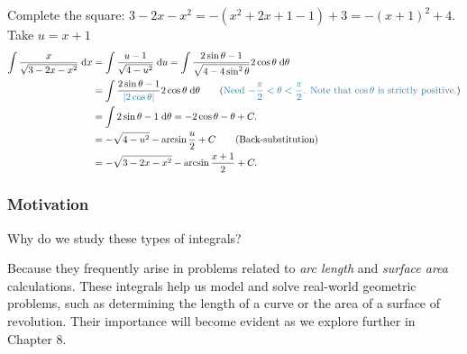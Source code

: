 \begin{ex}
Complete the square: $3 - 2x - x^2 = -(x^2+2x+1-1)+3 = -(x+1)^2+4$. Take $u = x+1$
    \begin{align*}
    \int \dfrac{x}{\sqrt{3 - 2x - x^2}} \dd x &= \int \dfrac{u-1}{\sqrt{4-u^2}} \dd u = \int \dfrac{2\sin \theta - 1}{\sqrt{4 - 4 \sin^2 \theta}}  2\cos \theta \dd \theta \\
    &= \int \dfrac{2\sin \theta - 1}{\blue{|2\cos \theta|}}  2\cos \theta \dd \theta \tag{\blue{Need $-\dfrac{\pi}{2} < \theta < \dfrac{\pi}{2}$. Note that $\cos \theta$ is strictly positive.}} \\
    &= \int 2\sin \theta -1 \dd\theta = -2\cos \theta -\theta + C. \\
    &= -\sqrt{4-u^2} - \arcsin\dfrac{u}{2} + C \tag{Back-substitution}\\
    &= -\sqrt{3-2x-x^2} - \arcsin\dfrac{x+1}{2} + C.
\end{align*}
\end{ex}

\subsubsection{Motivation} Why do we study these types of integrals? 

Because they frequently arise in problems related to \textit{arc length} and \textit{surface area} calculations. These integrals help us model and solve real-world geometric problems, such as determining the length of a curve or the area of a surface of revolution. Their importance will become evident as we explore further in Chapter 8.


